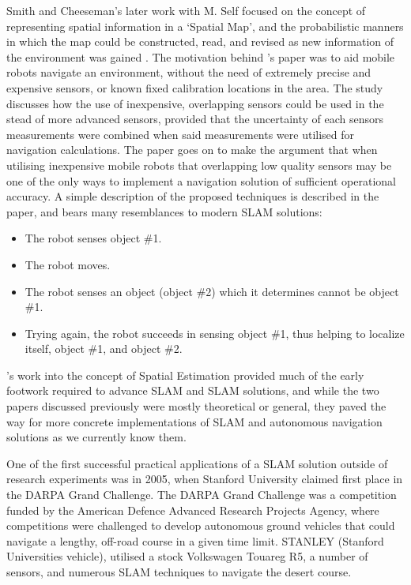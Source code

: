 Smith and Cheeseman's later work with M. Self focused on the concept of
representing spatial information in a `Spatial Map', and the probabilistic
manners in which the map could be constructed, read, and revised as new
information of the environment was gained \cite{Smith1988}.
The motivation behind \citeauthor{Smith1988}'s paper was to aid mobile robots
navigate an environment, without the need of extremely precise and expensive
sensors, or known fixed calibration locations in the area.
The study discusses how the use of inexpensive, overlapping sensors could be
used in the stead of more advanced sensors, provided that the uncertainty of
each sensors measurements were combined when said measurements were utilised
for navigation calculations.
The paper goes on to make the argument that when utilising inexpensive mobile
robots that overlapping low quality sensors may be one of the only ways to
implement a navigation solution of sufficient operational accuracy.
A simple description of the proposed techniques is described in the paper, and
bears many resemblances to modern SLAM solutions:

\begin{itemize}
    \item The robot senses object \#1.
    \item The robot moves. 
    \item The robot senses an object (object \#2) which it determines cannot be
    object \#1.
    \item Trying again, the robot succeeds in sensing object \#1, thus helping
    to localize itself, object \#1, and object \#2.
\end{itemize}

\citeauthor*{Smith1988}'s work into the concept of Spatial Estimation
provided much of the early footwork required to advance SLAM and SLAM
solutions, and while the two papers discussed previously were mostly
theoretical or general, they paved the way for more concrete implementations
of SLAM and autonomous navigation solutions as we currently know them.


One of the first successful practical applications of a SLAM solution outside of
research experiments was in 2005, when Stanford University claimed first
place in the DARPA Grand Challenge.
The DARPA Grand Challenge was a competition funded by the American Defence
Advanced Research Projects Agency, where competitions were challenged to
develop autonomous ground vehicles that could navigate a lengthy, off-road
course in a given time limit. 
STANLEY (Stanford Universities vehicle), utilised a stock Volkswagen
Touareg R5, a number of sensors, and numerous SLAM techniques to navigate the
desert course.

